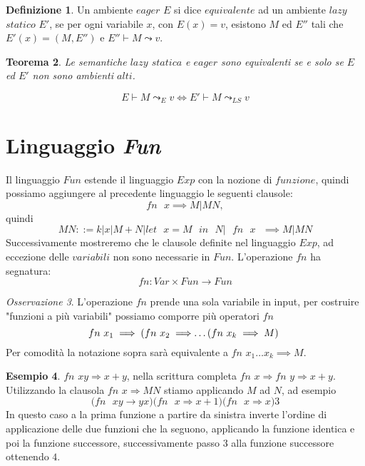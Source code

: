 \documentclass{article}
\newtheorem{theorem}{Teorema}[section]
\theoremstyle{definition}
\theoremstyle{definition}
\theoremstyle{definition}
\newtheorem{definition}[theorem]{Definizione}
\newtheorem{example}[theorem]{Esempio}
\theoremstyle{remark}
\newtheorem{remark}[theorem]{Osservazione}
\begin{document}
    \begin{definition}
        Un ambiente $eager$ $E$ si dice $equivalente$ ad un ambiente $lazy$ $statico$ $E'$, se per ogni variabile $x$,  con $E(x)=v$, esistono $M$ ed $E''$ tali che $E'(x) = (M,E'')$ e $E''\vdash M \leadsto v$.
    \end{definition}
    \begin{theorem}Le semantiche $lazy$ $statica$ e $eager$ sono equivalenti se e solo se $E$ ed $E'$ non sono ambienti $alti$.

        $$E\vdash M \leadsto_E v \iff E' \vdash M \leadsto_{LS} v$$
    \end{theorem}
    \section{Linguaggio \textit{Fun}}
    Il linguaggio $Fun$ estende il linguaggio $Exp$ con la nozione di $funzione$, quindi possiamo aggiungere al precedente linguaggio le seguenti clausole:
    $$ \text{$fn$ $x$} \implies M|MN,$$
    quindi
    $$MN ::= k|x|M+N|\text{$let$ $x=M$ $in$ $N|$ $fn$ $x$ }\implies M|MN$$
    Successivamente mostreremo che le clausole definite nel linguaggio $Exp$, ad eccezione delle $variabili$ non sono necessarie in $Fun$. L'operazione $fn$ ha segnatura:
    $$fn: Var\times Fun \to Fun$$
    \begin{remark}
        L'operazione $fn$ prende una sola variabile in input, per costruire "funzioni a più variabili" possiamo comporre più operatori $fn$
        $$\text{$fn$ $x_1 \implies (fn$ $x_2\implies$\dots($fn$ $x_k\implies M$) }$$
        Per comodità la notazione sopra sarà equivalente a $fn$ $x_1\dots x_k\implies M$.
    \end{remark}
    \begin{example}
        $fn$ $xy\Rightarrow x+y$, nella scrittura completa $fn$ $x\Rightarrow fn$ $y\Rightarrow x+y$.
        Utilizzando la clausola $fn$ $x\Rightarrow MN$ stiamo applicando $M$ ad $N$, ad esempio
        $$\text{$(fn$ $xy\rightarrow yx)$$(fn$ $x\Rightarrow x+1)$$(fn$ $x\Rightarrow x)3$}$$
        In questo caso a la prima funzione a partire da sinistra inverte l'ordine di applicazione delle due funzioni che la seguono,
        applicando la funzione identica e poi la funzione successore, successivamente passo $3$ alla funzione successore ottenendo $4$.
    \end{example}
\end{document}
